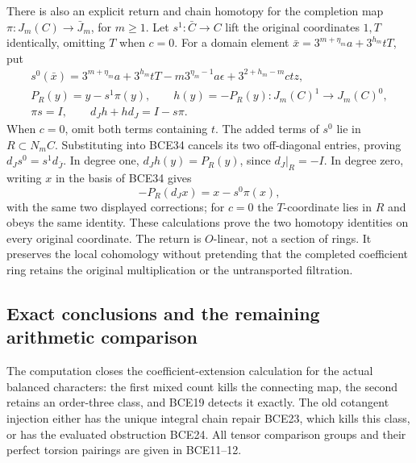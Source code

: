 There is also an explicit return and chain homotopy for
the completion map \(\pi:J_m(C)\to\bar J_m\), for \(m\ge1\).
Let \(s^1:\bar C\to C\) lift the original coordinates \(1,T\)
identically, omitting \(T\) when \(c=0\). For a domain element
\(\bar x=3^{m+\eta_m}a+3^{h_m}tT\), put
\begin{equation}\tag{BCE45}
\begin{gathered}
s^0(\bar x)=3^{m+\eta_m}a+3^{h_m}tT
-m3^{\eta_m-1}a\epsilon+3^{2+h_m-m}ctz,\\
P_R(y)=y-s^1\pi(y),\qquad
h(y)=-P_R(y):J_m(C)^1\longrightarrow J_m(C)^0,\\
\pi s=I,\qquad d_Jh+hd_J=I-s\pi .
\end{gathered}
\end{equation}
When \(c=0\), omit both terms containing \(t\).
The added terms of \(s^0\) lie in \(R\subset N_mC\).
Substituting into BCE34 cancels its two off-diagonal
entries, proving \(d_Js^0=s^1d_{\bar J}\).
In degree one, \(d_Jh(y)=P_R(y)\), since
\(d_J|_R=-I\). In degree zero, writing \(x\) in the
basis of BCE34 gives
\[
-P_R(d_Jx)=x-s^0\pi(x),
\]
with the same two displayed corrections; for \(c=0\)
the \(T\)-coordinate lies in \(R\) and obeys the same
identity. These calculations prove the two homotopy
identities on every original coordinate.
The return is \(O\)-linear, not a section of rings.
It preserves the local cohomology without pretending
that the completed coefficient ring retains the
original multiplication or the untransported filtration.

\subsection{Exact conclusions and the remaining arithmetic comparison}

The computation closes the coefficient-extension calculation
for the actual balanced characters: the first mixed count
kills the connecting map, the second retains an order-three
class, and BCE19 detects it exactly. The old cotangent
injection either has the unique integral chain repair BCE23,
which kills this class, or has the evaluated obstruction BCE24.
All tensor comparison groups and their perfect torsion
pairings are given in BCE11--12.

